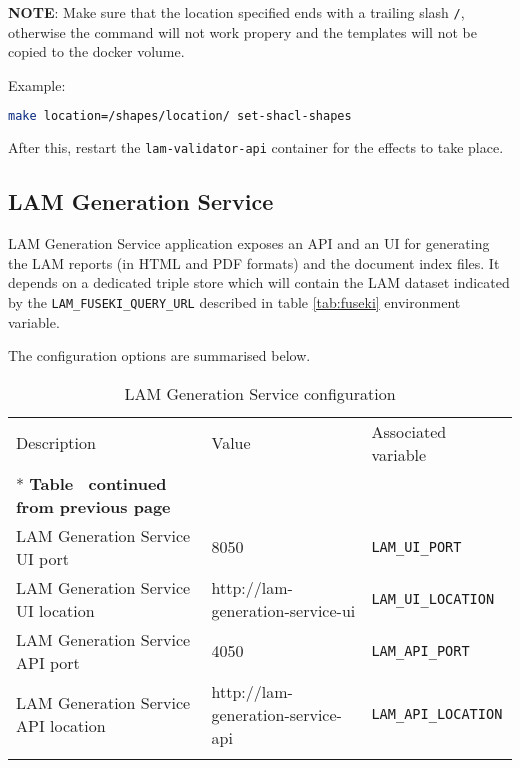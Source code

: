 \textbf{NOTE}: Make sure that the location specified ends with a trailing slash \texttt{/}, otherwise the command will not work propery and the templates will not be copied to the docker volume.

Example:
\begin{lstlisting}[language=bash]
make location=/shapes/location/ set-shacl-shapes
\end{lstlisting}

After this, restart the \texttt{lam-validator-api} container for the effects to take place.

\subsection{LAM Generation Service}

LAM Generation Service application exposes an API and an UI for generating the LAM reports (in HTML and PDF formats) and the document index files. It depends on a dedicated triple store which will contain the LAM dataset indicated by the \texttt{LAM\_FUSEKI\_QUERY\_URL} described in table \ref{tab:fuseki} environment variable. 

The configuration options are summarised below.

\begin{longtable}[c]{@{}p{4cm}p{5cm}l@{}}
	\toprule
	Description           & Value                   & Associated variable                   \\* \midrule
	\endfirsthead
	\multicolumn{3}{c}%
	{{\bfseries Table \thetable\ continued from previous page}}                             \\
	\endhead
	\bottomrule
	\endfoot
	\endlastfoot
	LAM Generation Service UI port  & 8050  & \texttt{LAM\_UI\_PORT}             \\	
	LAM Generation Service UI location  & http://lam-generation-service-ui  & \texttt{LAM\_UI\_LOCATION}             \\
	LAM Generation Service API port     & 4050                              & \texttt{LAM\_API\_PORT}                \\
	LAM Generation Service API location & http://lam-generation-service-api & \texttt{LAM\_API\_LOCATION}            \\
	\bottomrule
	\caption{LAM Generation Service configuration}
	\label{tab:lam-generation}                                                                   \\
\end{longtable}

